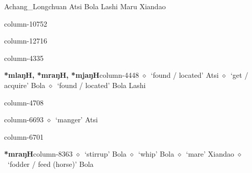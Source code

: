 \hspace{1ex}
         Achang\_Longchuan 
\hspace{1ex}
         Atsi 
\hspace{1ex}
         Bola 
\hspace{1ex}
         Lashi 
\hspace{1ex}
         Maru 
\hspace{1ex}
         Xiandao 
  \item {\footnotesize \textbf{}}{\tiny column-10752}
  \item {\footnotesize \textbf{}}{\tiny column-12716}
  \item {\footnotesize \textbf{}}{\tiny column-4335}
  \item {\footnotesize \textbf{*mlaŋH, *mraŋH, *mjaŋH}}{\tiny column-4448}
         $\diamond$~`found / located'
         Atsi 
\hspace{1ex}
         $\diamond$~`get / acquire'
         Bola 
\hspace{1ex}
         $\diamond$~`found / located'
         Bola 
\hspace{1ex}
         Lashi 
  \item {\footnotesize \textbf{}}{\tiny column-4708}
  \item {\footnotesize \textbf{}}{\tiny column-6693}
         $\diamond$~`manger'
         Atsi 
  \item {\footnotesize \textbf{}}{\tiny column-6701}
  \item {\footnotesize \textbf{*mraŋH}}{\tiny column-8363}
         $\diamond$~`stirrup'
         Bola 
\hspace{1ex}
         $\diamond$~`whip'
         Bola 
\hspace{1ex}
         $\diamond$~`mare'
         Xiandao 
\hspace{1ex}
         $\diamond$~`fodder / feed (horse)'
         Bola 
\hspace{1ex}
